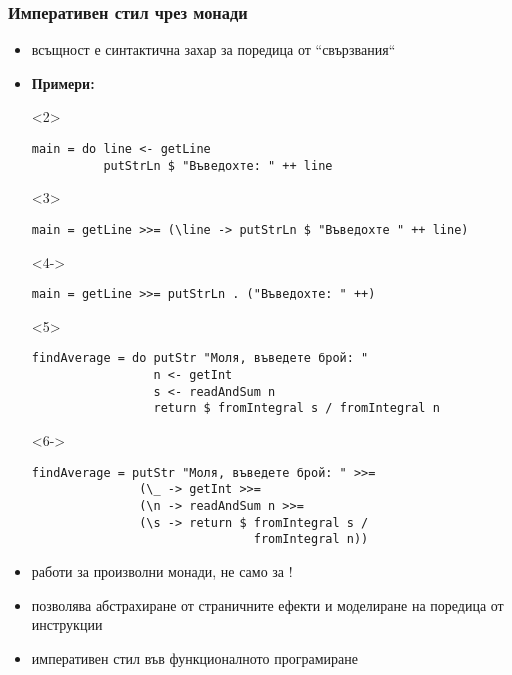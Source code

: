 \documentclass[alsotrans,beameroptions={aspectratio=169}]{beamerswitch}
\begin{document}
\begin{frame}[fragile]
  \frametitle{Императивен стил чрез монади}

  \small
  \begin{fixedarea}
    \begin{itemize}[<+->]
    \item {} всъщност е синтактична захар за поредица от ``свързвания``
    \item \textbf{Примери:}
      \begin{onlyenv}<2>
\begin{lstlisting}
main = do line <- getLine
          putStrLn $ "Въведохте: " ++ line
\end{lstlisting}
      \end{onlyenv}
      \begin{onlyenv}<3>
\begin{lstlisting}
main = getLine >>= (\line -> putStrLn $ "Въведохте " ++ line)
\end{lstlisting}
      \end{onlyenv}
      \begin{onlyenv}<4->
\begin{lstlisting}
main = getLine >>= putStrLn . ("Въведохте: " ++)
\end{lstlisting}
      \end{onlyenv}
      \begin{onlyenv}<5>
\begin{lstlisting}
findAverage = do putStr "Моля, въведете брой: "
                 n <- getInt
                 s <- readAndSum n
                 return $ fromIntegral s / fromIntegral n
\end{lstlisting}
      \end{onlyenv}
      \begin{onlyenv}<6->
\begin{lstlisting}
findAverage = putStr "Моля, въведете брой: " >>=
               (\_ -> getInt >>=
               (\n -> readAndSum n >>=
               (\s -> return $ fromIntegral s /
                               fromIntegral n))
\end{lstlisting}
      \end{onlyenv}
    \item<7-> работи за произволни монади, не само за !
    \item<8-> позволява абстрахиране от страничните ефекти и моделиране на поредица от инструкции
    \item<9-> императивен стил във функционалното програмиране
    \end{itemize}
  \end{fixedarea}
\end{frame}
\end{document}
